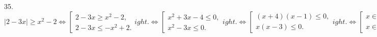 35. $|2-3x|\geqslant x^2-2\Leftrightarrow\left[\begin{array}{l}2-3x\geqslant x^2-2,\\ 2-3x\leqslant -x^2+2.\end{array}
ight.\Leftrightarrow
\left[\begin{array}{l}x^2+3x-4\leqslant 0,\\ x^2-3x\leqslant 0.\end{array}
ight.\Leftrightarrow
\left[\begin{array}{l}(x+4)(x-1)\leqslant 0,\\ x(x-3)\leqslant 0.\end{array}
ight.
\Leftrightarrow
\left[\begin{array}{l}x\in[-4;1],\\ x\in[0;3].\end{array}
ight.\Leftrightarrow
x\in[-4;3].$\\
